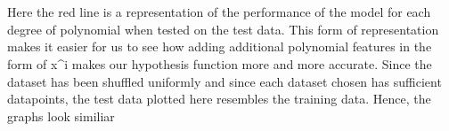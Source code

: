 \documentclass[11pt]{article}
\begin{document}
    \begin{center}
    \end{center}
    { \hspace*{\fill} \\}
    
    \begin{center}
    \end{center}
    { \hspace*{\fill} \\}
    
    \begin{center}
    \end{center}
    { \hspace*{\fill} \\}
    
    \begin{center}
    \end{center}
    { \hspace*{\fill} \\}
    
    \begin{center}
    \end{center}
    { \hspace*{\fill} \\}
    
    \begin{center}
    \end{center}
    { \hspace*{\fill} \\}
    
    \begin{center}
    \end{center}
    { \hspace*{\fill} \\}
    
    Here the red line is a representation of the performance of the model
for each degree of polynomial when tested on the test data. This form of
representation makes it easier for us to see how adding additional
polynomial features in the form of x\^{}i makes our hypothesis function
more and more accurate. Since the dataset has been shuffled uniformly
and since each dataset chosen has sufficient datapoints, the test data
plotted here resembles the training data. Hence, the graphs look
similiar


    
    
    
    
\end{document}
